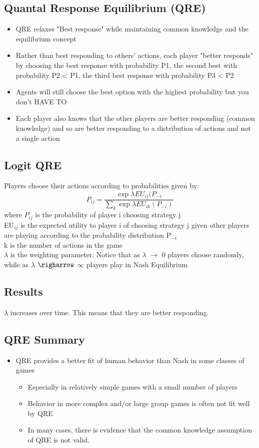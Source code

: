 \subsection{Quantal Response Equilibrium (QRE)}
\begin{itemize}
    \item QRE relaxes "Best response" while maintaining common knowledge and the equilibrium concept
    \item Rather than best responding to others' actions, each player "better responds" by choosing the best response with probability P1, the second best with probability P2 < P1, the third best response with probability P3 < P2
    \item Agents will still choose the best option with the highest probability but you don't HAVE TO
    \item Each player also knows that the other players are better responding (common knowledge) and so are better responding to a distribution of actions and not a single action
\end{itemize}
\subsection{Logit QRE}
Players choose their actions according to probabilities given by:
\[P_{ij} = \frac{\exp{\lambda EU_{ij}(P_{-i}}}{\sum_{k} \exp{\lambda EU_{ik}(P_{-i})}}\]
where $P_{ij}$ is the probability of player i choosing strategy j
\\EU$_{ij}$ is the expected utility to player i of choosing strategy j given other players are playing according to the probability distribution P$_{-i}$
\\k is the number of actions in the game
\\ $\lambda$ is the weighting parameter. Notice that as $\lambda$ $\rightarrow$ 0 players choose randomly, while as $\lambda$ $\righarrow$ $\infty$ players play in Nash Equilibrium
\subsection{Results}
$\lambda$ increases over time. This means that they are better responding.
\subsection{QRE Summary}
\begin{itemize}
    \item QRE provides a better fit of human behavior than Nash in some classes of games
    \begin{itemize}
        \item Especially in relatively simple games with a small number of players
        \item Behavior in more complex and/or large group games is often not fit well by QRE
        \item In many cases, there is evidence that the common knowledge assumption of QRE is not valid.
    \end{itemize}
\end{itemize}
